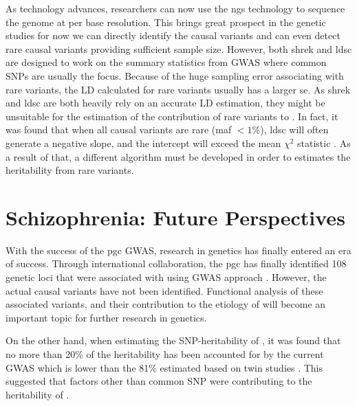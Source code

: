 \documentclass[12pt]{scrbook}
\newcommand*{\glng}{\glsentrylong}
\begin{document}
	As technology advances, researchers can now use the \gls{ngs} technology to sequence the genome at per base resolution. 
	This brings great prospect in the genetic studies for now we can directly identify the causal variants and can even detect rare causal variants providing sufficient sample size. 
	However, both \gls{shrek} and \gls{ldsc} are designed to work on the summary statistics from \gls{GWAS} where common \glspl{SNP} are usually the focus. 
	Because of the huge sampling error associating with rare variants, the \gls{LD} calculated for rare variants usually has a larger \gls{se}.
	As \gls{shrek} and \gls{ldsc} are both heavily rely on an accurate \gls{LD} estimation, they might be unsuitable for the estimation of the contribution of rare variants to \glng{scz}. 
	In fact, it was found that when all causal variants are rare (\gls{maf} $<1\%$), \gls{ldsc} will often generate a negative slope, and the intercept will exceed the mean $\chi^2$ statistic \citep{Bulik-Sullivan2015}.
	As a result of that, a different algorithm must be developed in order to estimates the heritability from rare variants.
	
	\section{Schizophrenia: Future Perspectives}
	With the success of the \gls{pgc} \glng{scz} \gls{GWAS}, research in \glng{scz} genetics has finally entered an era of success.
	Through international collaboration, the \gls{pgc} has finally identified 108 genetic loci that were associated with \glng{scz} using \gls{GWAS} approach \citep{Ripke2014}.
	However, the actual causal variants have not been identified. 
	Functional analysis of these associated variants, and their contribution to the etiology of \glng{scz} will become an important topic for further research in \glng{scz} genetics.
	
	On the other hand, when estimating the \gls{SNP}-heritability of \glng{scz}, it was found that no more than 20\% of the heritability has been accounted for by the current \gls{GWAS} which is lower than the 81\% estimated based on twin studies \citep{Sullivan2003}. 
	This suggested that factors other than common \gls{SNP} were contributing to the heritability of \glng{scz}.
	
\end{document}
